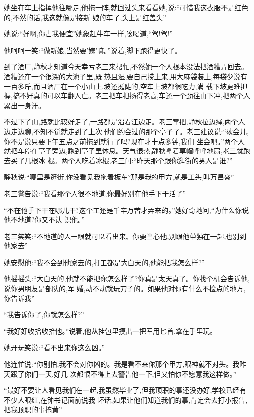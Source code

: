 ﻿\documentclass[12pt]{article}
\begin{document}
她坐在车上指挥他往哪走,他拖一阵,就回过头来看看她,说:``可惜我这衣服不是红色的,不然的话,我这就像是接新
娘的车了,头上是红盖头\myrule ''

她说:``好啊,你占我便宜\myrule ''她象赶牛车一样,吆喝道,``驾!驾!''

他呵呵一笑:``做新娘,当然要'嫁'嘛。''说着,脚下跑得更快了。


到了酒厂,静秋才知道今天幸亏老三来帮忙,不然她一个人根本没法把酒糟弄回去。酒糟还在一个很深的大池子里,既
热且湿,要自己捞上来,用大麻袋装上,每袋少说有一百多斤,而且酒厂在一个小山上,坡还挺陡的,空车上坡都很吃力,满
载下坡更难把握,搞不好真的可以车翻人亡。老三把车把扬得老高,车还一个劲往山下冲,把两个人累出一身汗。

不过下了山,路就比较好走了,一路都是沿着江边走。老三掌把,静秋拉边绳,两个人边走边聊,不知不觉就走到了上次
他们约会过的那个亭子了。老三建议说:``歇会儿,你不是说只要下午五点之前拖到就行了吗?现在才十点多钟,我们
坐会吧。''两个人就把车停在亭子旁边,跑到亭子里休息。天气很热,静秋拿着草帽呼呼地扇,老三就跑去买了几根冰
棍。两个人吃着冰棍,老三问:``昨天那个跟你逛街的男人是谁?''

静秋说:``哪里是逛街,你没看见我拖着板车?那是我的甲方,就是工头,叫万昌盛\myrule ''

老三警告说:``我看那个人很不地道,你最好别在他手下干活了\myrule ''

``不在他手下干在哪儿干?这个工还是\myrule 千辛万苦才弄来的。''她好奇地问,``为什么你说他不地道?你又不认
识他。''

老三笑笑:``不地道的人一眼就可以看出来。你要当心他,别跟他单独在一起,也别到他家去\myrule ''

她安慰他:``我不会到他家去的,打工都是大白天的,他能\myrule 把我怎么样?''

他摇摇头:``大白天的,他就不能把你怎么样了?你真是太天真了\myrule 。你找个机会告诉他,说你男朋友是部队的,军
婚,动不动就玩刀子的。如果他对你有什么\myrule 不检点的地方,你告诉我\myrule ''

``我告诉你了,你就怎么样?''

``我好好收拾收拾他。''说着,他从挂包里摸出一把军用匕首,拿在手里玩。

她开玩笑说:``看不出来你这么凶。''

他连忙说:``你别怕,我不会对你凶的。我是看不来你那个甲方,眼神就不对头。我昨天跟了你们一天\myrule ,好几
次都恨不得上去警告他一下,但又怕\myrule 你不愿意我这样做。''

``最好不要让人看见我们在一起,我虽然毕业了,但我顶职的事还没办好,学校已经有不少人眼红,在钟书记面前说我
坏话,如果让他们知道我们\myrule 的事,肯定会去打小报告,把我顶职的事搞黄\myrule ''
\end{document}
